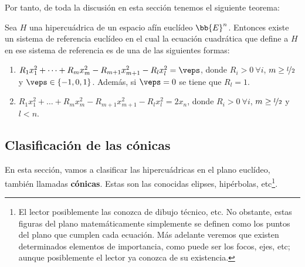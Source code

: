 Por tanto, de toda la discusión en esta sección tenemos el siguiente teorema:
\begin{teo}\label{teo:Clasif_Hiper}
    Sea $H$ una hipercuádrica de un espacio afín euclídeo $\bb{E}^n$. Entonces existe un sistema de referencia euclídeo en el cual la ecuación cuadrática que define a $H$ en ese sistema de referencia es de una de las siguientes formas:
    \begin{enumerate}
        \item $R_1x_1^2 + \dots + R_{m}x_{m}^2 - R_{m+1}x_{m+1}^2 - R_{l}x_{l}^2 = \veps$, donde $R_i>0~ \forall i$, $m\geq \nicefrac{l}{2}$ y $\veps \in \{-1,0,1\}$. Además, si $\veps=0$ se tiene que $R_l=1$.

        \item $R_1x_1^2 + \dots + R_{m}x_{m}^2 - R_{m+1}x_{m+1}^2 - R_{l}x_{l}^2 = 2x_n$, donde $R_i>0~ \forall i$, $m\geq \nicefrac{l}{2}$ y $l<n$.
    \end{enumerate}
\end{teo}


\subsection{Clasificación de las cónicas}

En esta sección, vamos a clasificar las hipercuádricas en el plano euclídeo, también llamadas \textbf{cónicas}. Estas son las conocidas elipses, hipérbolas, etc\footnote{El lector posiblemente las conozca de dibujo técnico, etc. No obstante, estas figuras del plano matemáticamente simplemente se definen como los puntos del plano que cumplen cada ecuación. Más adelante veremos que existen determinados elementos de importancia, como puede ser los focos, ejes, etc; aunque posiblemente el lector ya conozca de su existencia.}.

